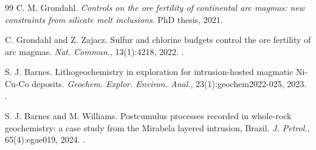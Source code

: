 \documentclass[10pt,twocolumn,letterpaper]{article}
\begin{document}
\begin{thebibliography}{99}
 C. M. Grondahl. \textit{Controls on the ore fertility of continental arc magmas: new constraints from silicate melt inclusions}. PhD thesis, 2021.

 C. Grondahl and Z. Zajacz. Sulfur and chlorine budgets control the ore fertility of arc magmas. \textit{Nat. Commun.}, 13(1):4218, 2022. .

 S. J. Barnes. Lithogeochemistry in exploration for intrusion-hosted magmatic Ni-Cu-Co deposits. \textit{Geochem. Explor. Environ. Anal.}, 23(1):geochem2022-025, 2023. .

 S. J. Barnes and M. Williams. Postcumulus processes recorded in whole-rock geochemistry: a case study from the Mirabela layered intrusion, Brazil. \textit{J. Petrol.}, 65(4):egae019, 2024. .


\end{thebibliography}
\endgroup
\end{document}
